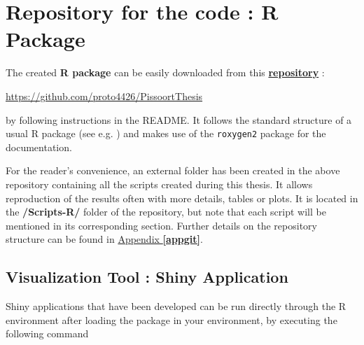 \section{Repository for the code : R Package}\label{sec:packa}

The created \textbf{R package} can be easily downloaded from this \href{https://github.com/proto4426/PissoortThesis}{\textbf{repository}} :
\begin{center}\label{xxx}
 \url{https://github.com/proto4426/PissoortThesis}
\end{center}
by following instructions in the README. It follows the standard structure of a usual R package (see e.g. \citet{leisch_creating_2008}) and makes use of the \texttt{roxygen2} package for the documentation.

For the reader's convenience, an external folder has been created in the above repository containing all the scripts created during this thesis. It allows reproduction of the results often with more details, tables or plots. It is located in the \textbf{/Scripts-R/} folder of the repository, but note that each script will be mentioned in its corresponding section. Further details on the repository structure can be found in \hyperref[appgit]{Appendix \textbf{\ref{appgit}}}.

\subsection*{Visualization Tool : Shiny Application}

Shiny applications that have been developed can be run directly through the R environment after loading the package in your environment, by executing the following command

